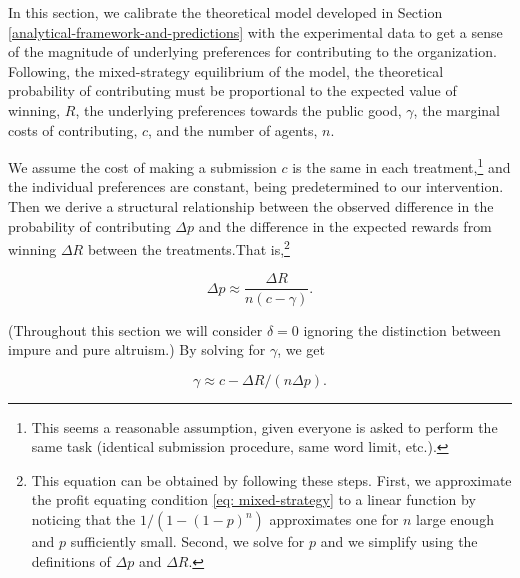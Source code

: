 \documentclass[11pt, titlepage]{article}
\begin{document}
In this section, we calibrate the theoretical model developed in Section
\ref{analytical-framework-and-predictions} with the experimental data to
get a sense of the magnitude of underlying preferences for contributing
to the organization. Following, the mixed-strategy equilibrium of the
model, the theoretical probability of contributing must be proportional
to the expected value of winning, \(R\), the underlying preferences
towards the public good, \(\gamma\), the marginal costs of contributing,
\(c\), and the number of agents, \(n\).

We assume the cost of making a submission \(c\) is the same in each
treatment,\footnote{This seems a reasonable assumption, given everyone
  is asked to perform the same task (identical submission procedure,
  same word limit, etc.).} and the individual preferences are constant,
being predetermined to our intervention. Then we derive a structural
relationship between the observed difference in the probability of
contributing \(\Delta p\) and the difference in the expected rewards
from winning \(\Delta R\) between the treatments.That is,\footnote{This
  equation can be obtained by following these steps. First, we
  approximate the profit equating condition \eqref{eq: mixed-strategy}
  to a linear function by noticing that the \(1/(1-(1-p)^n)\)
  approximates one for \(n\) large enough and \(p\) sufficiently small.
  Second, we solve for \(p\) and we simplify using the definitions of
  \(\Delta p\) and \(\Delta R\).}

\begin{equation}
  \Delta p \approx\frac{\Delta R}{n (c - \gamma)}.
\end{equation}

(Throughout this section we will consider \(\delta=0\) ignoring the
distinction between impure and pure altruism.) By solving for
\(\gamma\), we get

\begin{equation}
  \label{eq: gamma}
  \gamma   \approx  c -  \Delta R / (n\Delta p). 
\end{equation}
\end{document}
